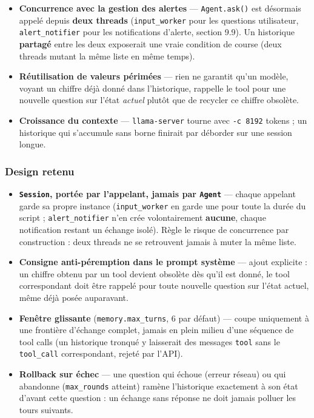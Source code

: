 \documentclass[11pt,a4paper]{article}
\let\Oldsubsubsection\subsubsection
\renewcommand{\subsubsection}{\FloatBarrier\Oldsubsubsection}
\begin{document}
    \begin{itemize}[leftmargin=1.5em]
      \item \textbf{Concurrence avec la gestion des alertes} --- \texttt{Agent.ask()} est
        désormais appelé depuis \textbf{deux threads} (\texttt{input\_worker}
        pour les questions utilisateur, \texttt{alert\_notifier} pour les
        notifications d'alerte, section 9.9). Un historique
        \textbf{partagé} entre les deux exposerait une vraie condition de
        course (deux threads mutant la même liste en même temps).
      \item \textbf{Réutilisation de valeurs périmées} --- rien ne garantit
        qu'un modèle, voyant un chiffre déjà donné dans l'historique,
        rappelle le tool pour une nouvelle question sur l'état
        \emph{actuel} plutôt que de recycler ce chiffre obsolète.
      \item \textbf{Croissance du contexte} --- \texttt{llama-server}
        tourne avec \texttt{-c 8192} tokens ; un historique qui s'accumule
        sans borne finirait par déborder sur une session longue.
    \end{itemize}
    
    \subsubsection{Design retenu}
    
    \begin{itemize}[leftmargin=1.5em]
      \item \textbf{\texttt{Session}, portée par l'appelant, jamais par
        \texttt{Agent}} --- chaque appelant garde sa propre instance
        (\texttt{input\_worker} en garde une pour toute la durée du script ;
        \texttt{alert\_notifier} n'en crée volontairement \textbf{aucune},
        chaque notification restant un échange isolé). Règle le risque de
        concurrence par construction : deux threads ne se retrouvent jamais
        à muter la même liste.
      \item \textbf{Consigne anti-péremption dans le prompt système} ---
        ajout explicite : un chiffre obtenu par un tool devient obsolète
        dès qu'il est donné, le tool correspondant doit être rappelé pour
        toute nouvelle question sur l'état actuel, même déjà posée
        auparavant.
      \item \textbf{Fenêtre glissante} (\texttt{memory.max\_turns}, 6 par
        défaut) --- coupe uniquement à une frontière d'échange complet,
        jamais en plein milieu d'une séquence de tool calls (un historique
        tronqué y laisserait des messages \texttt{tool} sans le
        \texttt{tool\_call} correspondant, rejeté par l'API).
      \item \textbf{Rollback sur échec} --- une question qui échoue
        (erreur réseau) ou qui abandonne (\texttt{max\_rounds} atteint)
        ramène l'historique exactement à son état d'avant cette question :
        un échange sans réponse ne doit jamais polluer les tours suivants.
    \end{itemize}
    
\end{document}
